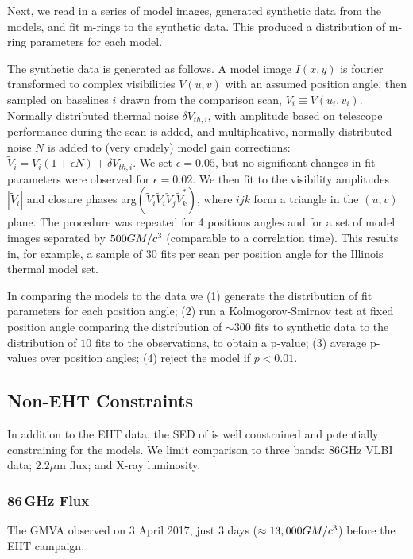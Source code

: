 Next, we read in a series of model images, generated synthetic data from the models, and fit m-rings to the synthetic data.  This produced a distribution of m-ring parameters for each model.   

The synthetic data is generated as follows.  A model image $I(x,y)$ is fourier transformed to complex visibilities $V(u,v)$ with an assumed position angle, then sampled on baselines $i$ drawn from the comparison scan, $V_i \equiv V(u_i,v_i)$.  Normally distributed thermal noise $\delta V_{th,i}$, with amplitude based on telescope performance during the scan is added, and multiplicative, normally distributed noise $N$ is added to (very crudely) model gain corrections: $\tilde{V}_i = V_i (1 + \epsilon N) + \delta V_{th,i}$.  We set $\epsilon = 0.05$, but no significant changes in fit parameters were observed for $\epsilon = 0.02$.  We then fit to the visibility amplitudes $|\tilde{V}_i|$ and closure phases arg$(\tilde{V}_i \tilde{V}_i \tilde{V}_j \tilde{V}_k^*)$, where $ijk$ form a triangle in the $(u,v)$ plane.  The procedure was repeated for 4 positions angles and for a set of model images separated by $500 GM/c^3$ (comparable to a correlation time).  This results in, for example, a sample of $30$ fits per scan per position angle for the Illinois thermal model set.  

In comparing the models to the data we (1) generate the distribution of fit parameters for each position angle; (2) run a Kolmogorov-Smirnov test at fixed position angle comparing the distribution of $\sim 300$ fits to synthetic data to the distribution of $10$ fits to the observations, to obtain a p-value; (3) average p-values over position angles; (4) reject the model if $p < 0.01$.

\subsection{Non-EHT Constraints}

In addition to the EHT data, the SED of \sgra is well constrained \citep{PaperII} and potentially constraining for the models.  We limit comparison to three bands: 86GHz VLBI data; $2.2\mu$m flux; and X-ray luminosity.  

\subsubsection{86\,GHz Flux}

The GMVA observed \sgra on 3 April 2017, just 3 days ($\approx 13,000 GM/c^3$) before the EHT campaign.  


